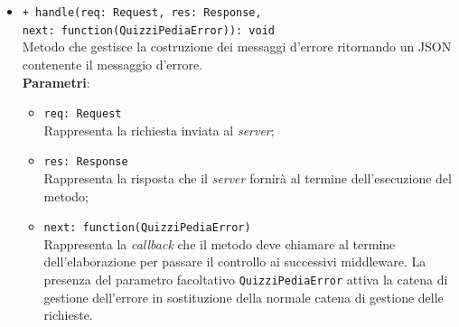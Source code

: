 \begin{itemize}
\begin{itemize}
		\item \texttt{+ handle(req: Request, res: Response, \\next: function(QuizziPediaError)): void}\\
		Metodo che gestisce la costruzione dei messaggi d'errore ritornando un JSON contenente il messaggio d'errore.\\
		\textbf{Parametri}:
		\begin{itemize}
			\item \texttt{req: Request}\\
			Rappresenta la richiesta inviata al \textit{server};
			\item \texttt{res: Response}\\
			Rappresenta la risposta che il \textit{server} fornirà al termine dell'esecuzione del metodo;
			\item \texttt{next: function(QuizziPediaError)}\\
			Rappresenta la \textit{callback} che il metodo deve chiamare al termine dell'elaborazione per passare il controllo ai successivi middleware. La presenza del parametro facoltativo \texttt{QuizziPediaError} attiva la catena di gestione dell'errore in sostituzione della normale catena di gestione delle richieste.
		\end{itemize}
	\end{itemize}
\end{itemize}

